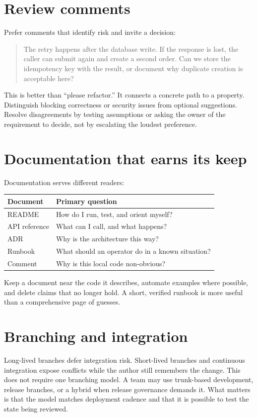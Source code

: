 \section{Review comments}
Prefer comments that identify risk and invite a decision:

\begin{quote}
The retry happens after the database write. If the response is lost, the caller
can submit again and create a second order. Can we store the idempotency key with
the result, or document why duplicate creation is acceptable here?
\end{quote}

This is better than “please refactor.” It connects a concrete path to a property.
Distinguish blocking correctness or security issues from optional suggestions.
Resolve disagreements by testing assumptions or asking the owner of the
requirement to decide, not by escalating the loudest preference.

\section{Documentation that earns its keep}
Documentation serves different readers:

\noindent\begin{tabularx}{\textwidth}{@{}p{}X@{}}
\toprule
Document & Primary question \\
\midrule
README & How do I run, test, and orient myself? \\
API reference & What can I call, and what happens? \\
ADR & Why is the architecture this way? \\
Runbook & What should an operator do in a known situation? \\
Comment & Why is this local code non-obvious? \\
\bottomrule
\end{tabularx}

Keep a document near the code it describes, automate examples where possible,
and delete claims that no longer hold. A short, verified runbook is more useful
than a comprehensive page of guesses.

\section{Branching and integration}
Long-lived branches defer integration risk. Short-lived branches and continuous
integration expose conflicts while the author still remembers the change. This
does not require one branching model. A team may use trunk-based development,
release branches, or a hybrid when release governance demands it. What matters is
that the model matches deployment cadence and that it is possible to test the
state being reviewed.

